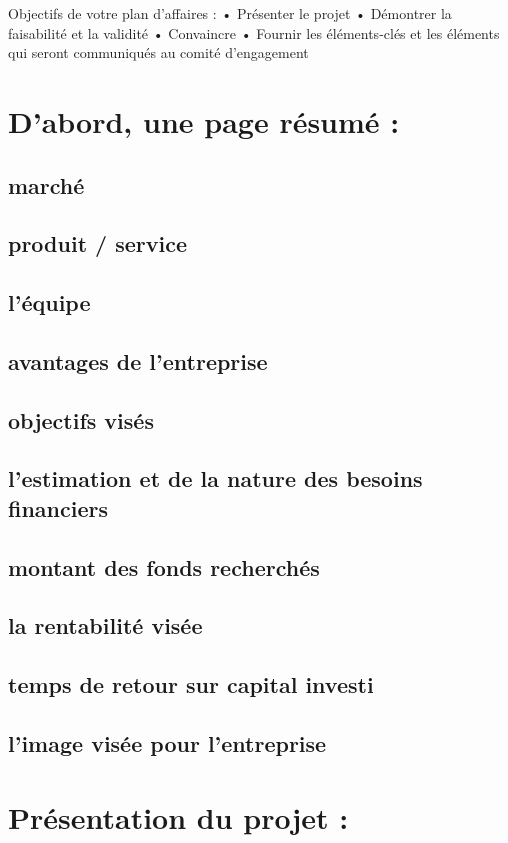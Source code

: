 Objectifs de votre plan d'affaires : 
    • Présenter le projet
    • Démontrer la faisabilité et la validité
    • Convaincre
    • Fournir les éléments-clés et les éléments qui seront communiqués au comité d'engagement

\section{D'abord, une page résumé :}
	\subsection{marché}
	\subsection{produit / service}
	\subsection{l'équipe}
	\subsection{avantages de l'entreprise}
	\subsection{objectifs visés}
	\subsection{l'estimation et de la nature des besoins financiers}
	\subsection{montant des fonds recherchés}
	\subsection{la rentabilité visée}
	\subsection{temps de retour sur capital investi}
	\subsection{l'image visée pour l'entreprise}

\section{Présentation du projet :}
